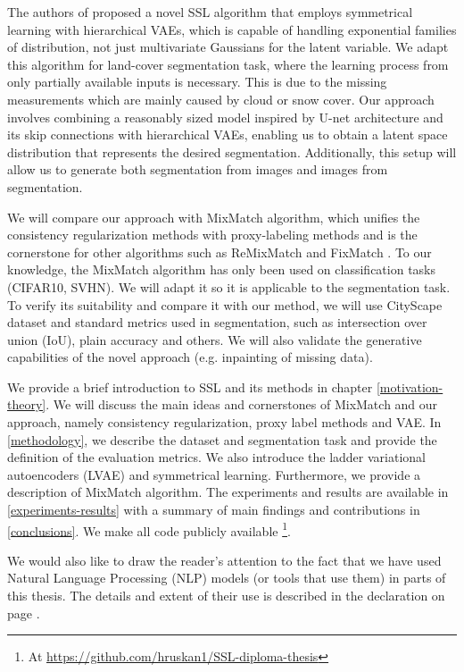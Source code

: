 The authors of \cite{not-published} proposed a novel SSL algorithm that employs symmetrical learning with hierarchical VAEs, which is capable of
handling exponential families of distribution, not just multivariate Gaussians for the latent variable. We adapt this algorithm for  
land-cover segmentation task, where the learning process from only partially available inputs is necessary. This is due to the missing measurements 
which are mainly caused by cloud or snow cover. 
Our approach involves combining a reasonably sized model inspired by U-net architecture and its skip connections\cite{unet-2015} with hierarchical VAEs, enabling
us to obtain a latent space distribution that represents the desired segmentation. Additionally, this setup will allow us to generate both segmentation from images 
and images from segmentation.

We will compare our approach with MixMatch \cite{mixmatch-2019} algorithm, which unifies the consistency regularization methods with proxy-labeling
methods \cite{ssl-overview-2020} and is the cornerstone for other algorithms such as ReMixMatch \cite{remixmatch-2020} and FixMatch \cite{fixmatch-2020}.
To our knowledge, the MixMatch algorithm has only been used on classification tasks (CIFAR10, SVHN). We will adapt it so it is applicable
to the segmentation task. To verify its suitability and compare it with our method, we will use CityScape dataset and standard metrics used in 
segmentation, such as intersection over union (IoU), plain accuracy  and others. We will also validate the generative capabilities of the novel approach (e.g. 
inpainting of missing data).

We provide a brief introduction to SSL and its methods in chapter \ref{motivation-theory}. We will discuss the main ideas and cornerstones of 
MixMatch and our approach, namely consistency regularization, proxy label methods and VAE. In \ref{methodology}, we describe the dataset and 
segmentation task and provide the definition of the evaluation metrics. We also introduce the ladder variational autoencoders (LVAE) and 
symmetrical learning. Furthermore, we provide a description of MixMatch algorithm. The experiments and results are available in 
\ref{experiments-results} with a summary of main findings and contributions in \ref{conclusions}. We make all code publicly available
\footnote[2]{At \url{https://github.com/hruskan1/SSL-diploma-thesis}}. 

We would also like to draw the reader's attention to the fact that we have used Natural Language Processing (NLP) models (or tools that use them) 
in parts of this thesis. The details and extent of their use is described in the declaration on page \pageref{sec:decleration}.


